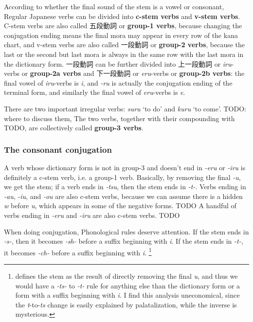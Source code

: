 \documentclass[UTF8, a4paper, oneside, scheme=plain]{ctexart}
\newcommand*{\concept}[1]{\textbf{#1}}
\newcommand{\corpus}[1]{\emph{#1}}
\newcommand{\translate}[1]{`#1'}
\begin{document}
According to whether the final sound of the stem is a vowel or consonant,
Regular Japanese verbs can be divided into \concept{c-stem verbs} and \concept{v-stem verbs}.
C-stem verbs are also called 五段動詞 or \concept{group-1 verbs},
because changing the conjugation ending means the final mora may appear in every row of the kana chart, 
and v-stem verbs are also called 一段動詞 or \concept{group-2 verbs},
because the last or the second but last mora is always in the same row with the last mora in the dictionary form.
一段動詞 can be further divided into 上一段動詞 or \corpus{iru}-verbs or \concept{group-2a verbs} 
and 下一段動詞 or \corpus{eru}-verbs or \concept{group-2b verbs}:
the final vowel of \corpus{iru}-verbs is \corpus{i},
and \corpus{-ru} is actually the conjugation ending of the terminal form,
and similarly the final vowel of \corpus{eru}-verbs is \corpus{e}.

There are two important irregular verbs: \corpus{suru} \translate{to do} and \corpus{kuru} \translate{to come}.
TODO: where to discuss them, 
The two verbs, together with their compounding with TODO,
are collectively called \concept{group-3 verbs}.

\subsubsection{The consonant conjugation}\label{sec:consonant-class}

A verb whose dictionary form is not in group-3 and doesn't end in \corpus{-eru} or \corpus{-iru} 
is definitely a c-stem verb, i.e. a group-1 verb.
Basically, by removing the final \corpus{-u}, we get the stem;
if a verb ends in \corpus{-tsu},
then the stem ends in \corpus{-t-}.
Verbs ending in \corpus{-au}, \corpus{-iu}, and \corpus{-ou} are also c-stem verbs,
because we can assume there is a hidden \corpus{w} before \corpus{u},
which appears in some of the negative forms. TODO
A handful of verbs ending in \corpus{-eru} and \corpus{-iru} are also c-stem verbs. TODO

When doing conjugation, Phonological rules deserve attention.
If the stem ends in \corpus{-s-}, 
then it becomes \corpus{-sh-} before a suffix beginning with \corpus{i}.
If the stem ends in \corpus{-t-},
it becomes \corpus{-ch-} before a suffix beginning with \corpus{i}.%
\footnote{
    \citet{akiyama2012japanese} defines the stem as the result of directly removing the final \corpus{u},
    and thus we would have a \corpus{-ts-} to \corpus{-t-} rule 
    for anything else than the dictionary form or a form with a suffix beginning with \corpus{i}.
    I find this analysis uneconomical,
    since the \corpus{t}-to-\corpus{ts} change is easily explained by palatalization,
    while the inverse is mysterious.
}
\end{document}
